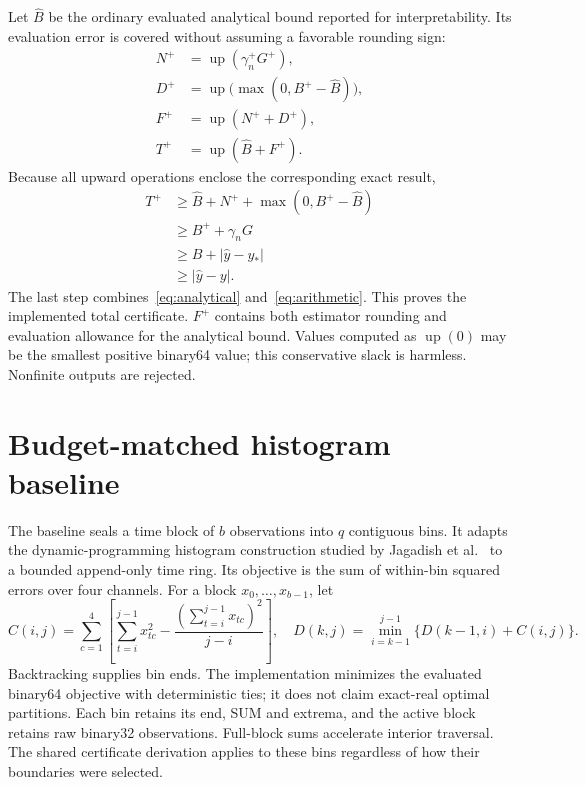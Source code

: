 \documentclass[10pt]{article}
\newcommand{\up}{\operatorname{up}}
\begin{document}
Let $\widehat B$ be the ordinary evaluated analytical bound reported for interpretability. Its evaluation error is covered without assuming a favorable rounding sign:
\begin{align}
 N^+&=\up(\gamma_n^+G^+),\\
 D^+&=\up\bigl(\max(0,B^+-\widehat B)\bigr),\\
 F^+&=\up(N^++D^+),\\
 T^+&=\up(\widehat B+F^+).
 \label{eq:final}
\end{align}
Because all upward operations enclose the corresponding exact result,
\begin{align}
 T^+&\geq\widehat B+N^++\max(0,B^+-\widehat B)\\
 &\geq B^++\gamma_nG\\
 &\geq B+|\widehat y-y_*|\\
 &\geq|\widehat y-y|.
\end{align}
The last step combines~\eqref{eq:analytical} and~\eqref{eq:arithmetic}. This proves the implemented total certificate. $F^+$ contains both estimator rounding and evaluation allowance for the analytical bound. Values computed as $\up(0)$ may be the smallest positive binary64 value; this conservative slack is harmless. Nonfinite outputs are rejected.

\section{Budget-matched histogram baseline}
The baseline seals a time block of $b$ observations into $q$ contiguous bins. It adapts the dynamic-programming histogram construction studied by Jagadish et al.~\cite{jagadish1998} to a bounded append-only time ring. Its objective is the sum of within-bin squared errors over four channels. For a block $x_0,\ldots,x_{b-1}$, let
\begin{equation}
 C(i,j)=\sum_{c=1}^4\left[\sum_{t=i}^{j-1}x_{tc}^2-
 \frac{(\sum_{t=i}^{j-1}x_{tc})^2}{j-i}\right],\quad
 D(k,j)=\min_{i=k-1}^{j-1}\{D(k-1,i)+C(i,j)\}.
\end{equation}
Backtracking supplies bin ends. The implementation minimizes the evaluated binary64 objective with deterministic ties; it does not claim exact-real optimal partitions. Each bin retains its end, SUM and extrema, and the active block retains raw binary32 observations. Full-block sums accelerate interior traversal. The shared certificate derivation applies to these bins regardless of how their boundaries were selected.
\end{document}

